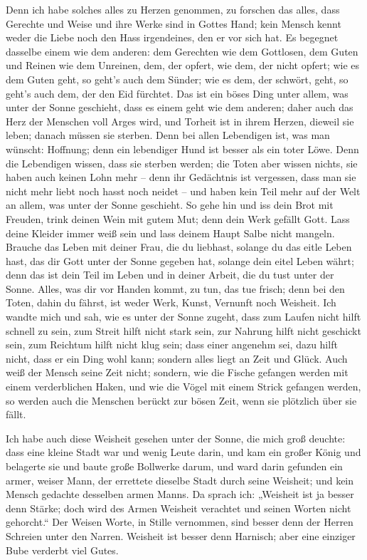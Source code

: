  Denn ich habe solches alles zu Herzen genommen, zu
forschen das alles, dass Gerechte und Weise und ihre Werke sind in
Gottes Hand; kein Mensch kennt weder die Liebe noch den Hass
irgendeines, den er vor sich hat.  Es begegnet dasselbe
einem wie dem anderen: dem Gerechten wie dem Gottlosen, dem Guten und
Reinen wie dem Unreinen, dem, der opfert, wie dem, der nicht opfert; wie
es dem Guten geht, so geht's auch dem Sünder; wie es dem, der schwört,
geht, so geht's auch dem, der den Eid fürchtet.  Das ist
ein böses Ding unter allem, was unter der Sonne geschieht, dass es einem
geht wie dem anderen; daher auch das Herz der Menschen voll Arges wird,
und Torheit ist in ihrem Herzen, dieweil sie leben; danach müssen sie
sterben.  Denn bei allen Lebendigen ist, was man wünscht:
Hoffnung; denn ein lebendiger Hund ist besser als ein toter Löwe.
 Denn die Lebendigen wissen, dass sie sterben werden; die
Toten aber wissen nichts, sie haben auch keinen Lohn mehr -- denn ihr
Gedächtnis ist vergessen,  dass man sie nicht mehr liebt
noch hasst noch neidet -- und haben kein Teil mehr auf der Welt an
allem, was unter der Sonne geschieht.  So gehe hin und iss
dein Brot mit Freuden, trink deinen Wein mit gutem Mut; denn dein Werk
gefällt Gott.  Lass deine Kleider immer weiß sein und lass
deinem Haupt Salbe nicht mangeln.  Brauche das Leben mit
deiner Frau, die du liebhast, solange du das eitle Leben hast, das dir
Gott unter der Sonne gegeben hat, solange dein eitel Leben währt; denn
das ist dein Teil im Leben und in deiner Arbeit, die du tust unter der
Sonne.  Alles, was dir vor Handen kommt, zu tun, das tue
frisch; denn bei den Toten, dahin du fährst, ist weder Werk, Kunst,
Vernunft noch Weisheit.  Ich wandte mich und sah, wie es
unter der Sonne zugeht, dass zum Laufen nicht hilft schnell zu sein, zum
Streit hilft nicht stark sein, zur Nahrung hilft nicht geschickt sein,
zum Reichtum hilft nicht klug sein; dass einer angenehm sei, dazu hilft
nicht, dass er ein Ding wohl kann; sondern alles liegt an Zeit und
Glück.  Auch weiß der Mensch seine Zeit nicht; sondern,
wie die Fische gefangen werden mit einem verderblichen Haken, und wie
die Vögel mit einem Strick gefangen werden, so werden auch die Menschen
berückt zur bösen Zeit, wenn sie plötzlich über sie fällt.

 Ich habe auch diese Weisheit gesehen unter der Sonne,
die mich groß deuchte:  dass eine kleine Stadt war und
wenig Leute darin, und kam ein großer König und belagerte sie und baute
große Bollwerke darum,  und ward darin gefunden ein
armer, weiser Mann, der errettete dieselbe Stadt durch seine Weisheit;
und kein Mensch gedachte desselben armen Manns.  Da
sprach ich: „Weisheit ist ja besser denn Stärke; doch wird des Armen
Weisheit verachtet und seinen Worten nicht gehorcht.`` 
Der Weisen Worte, in Stille vernommen, sind besser denn der Herren
Schreien unter den Narren.  Weisheit ist besser denn
Harnisch; aber eine einziger Bube verderbt viel Gutes.

